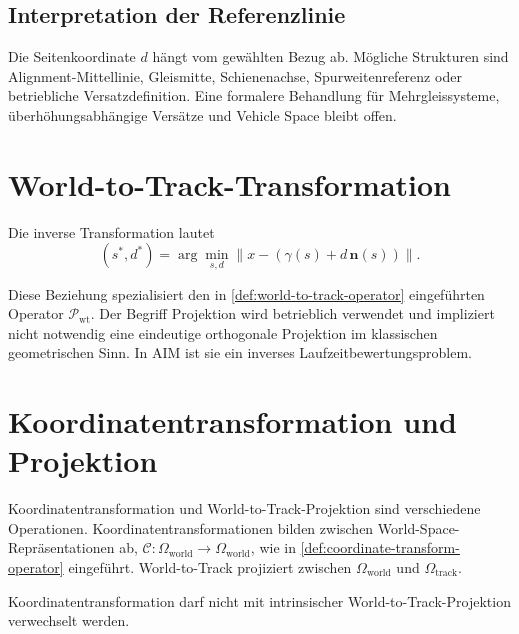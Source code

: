 \subsection{Interpretation der Referenzlinie}

Die Seitenkoordinate \(d\) hängt vom gewählten Bezug ab. Mögliche Strukturen
sind Alignment-Mittellinie, Gleismitte, Schienenachse, Spurweitenreferenz oder
betriebliche Versatzdefinition. Eine formalere Behandlung für Mehrgleissysteme,
überhöhungsabhängige Versätze und Vehicle Space bleibt offen.

\section{World-to-Track-Transformation}

\begin{definition}
\label{def:state-world-to-track-runtime}
Die inverse Transformation lautet
\begin{equation}
(s^\ast,d^\ast)
=
\arg\min_{s,d}
\|x-(\gamma(s)+d\,\mathbf n(s))\|.
\label{eq:state-world-to-track-runtime}
\end{equation}
\end{definition}

Diese Beziehung spezialisiert den in
\cref{def:world-to-track-operator} eingeführten Operator
\(\mathcal P_{\mathrm{wt}}\). Der Begriff Projektion wird betrieblich
verwendet und impliziert nicht notwendig eine eindeutige orthogonale Projektion
im klassischen geometrischen Sinn. In AIM ist sie ein inverses
Laufzeitbewertungsproblem.

\section{Koordinatentransformation und Projektion}

Koordinatentransformation und World-to-Track-Projektion sind verschiedene
Operationen. Koordinatentransformationen bilden zwischen
World-Space-Repräsentationen ab,
\(\mathcal C:\Omega_{\mathrm{world}}\to\Omega_{\mathrm{world}}\), wie in
\cref{def:coordinate-transform-operator} eingeführt.
World-to-Track projiziert zwischen \(\Omega_{\mathrm{world}}\) und
\(\Omega_{\mathrm{track}}\).

\begin{principle}[Projektionsunterscheidungsprinzip]
\label{princ:projection-distinction}
Koordinatentransformation darf nicht mit intrinsischer
World-to-Track-Projektion verwechselt werden.
\end{principle}

